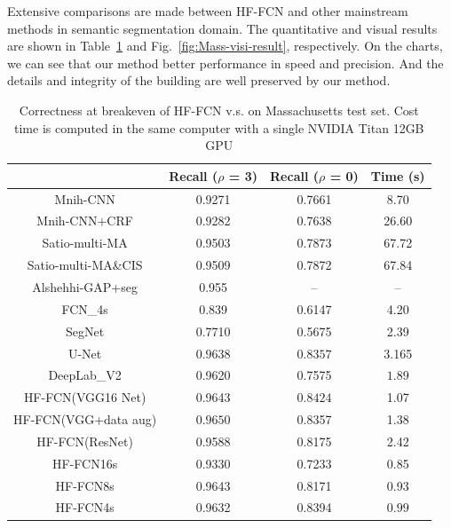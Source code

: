 Extensive comparisons are made between HF-FCN and other mainstream methods in semantic segmentation domain. The quantitative and visual results are shown in Table~\ref{table:Mass-results} and Fig.~\ref{fig:Mass-visi-result}, respectively. On the charts, we can see that our method better performance in speed and precision. And the details and integrity of the building are well preserved by our method.
\begin{table}
\centering
\caption {Correctness at breakeven of HF-FCN v.s. \cite{IEEEexample:mnih2013machine}\cite{IEEEexample:saito2016multiple}\cite{IEEEexample:alshehhi2017simultaneous}\cite{IEEEexample:Long_2015_CVPR}\cite{IEEEexample:badrinarayanan2017segnet}
\cite{IEEEexample:ronneberger2015u}\cite{IEEEexample:chen2016deeplab}on Massachusetts test set. Cost time is computed in the same computer with a single NVIDIA Titan 12GB GPU}
\label{table:Mass-results}
\begin{tabular}{cccc}
\hline
&Recall ($\rho$ = 3)&Recall ($\rho$ = 0)&Time (s)\\
\hline
Mnih-CNN \cite{IEEEexample:mnih2013machine}&0.9271&0.7661&8.70\\
Mnih-CNN+CRF\cite{IEEEexample:mnih2013machine} &0.9282&0.7638&26.60\\
Satio-multi-MA \cite{IEEEexample:saito2016multiple}&0.9503&0.7873&67.72\\
Satio-multi-MA\&CIS \cite{IEEEexample:saito2016multiple}&0.9509&0.7872&67.84\\
Alshehhi-GAP+seg \cite{IEEEexample:alshehhi2017simultaneous}&0.955&{--}&{--} \\ \hline
FCN\_4s\cite{IEEEexample:Long_2015_CVPR}&0.839&0.6147&4.20\\
SegNet\cite{IEEEexample:badrinarayanan2017segnet}&0.7710&0.5675&2.39\\
U-Net\cite{IEEEexample:ronneberger2015u}& $\bm{0.9638}$& $\bm{0.8357}$& 3.165\\
DeepLab\_V2\cite{IEEEexample:chen2016deeplab}&0.9620&0.7575&$\bm{1.89}$\\ \hline
HF-FCN(VGG16 Net)&0.9643& $\bm{0.8424}$ &1.07\\
HF-FCN(VGG+data aug)&$\bm{0.9650}$&0.8357&1.38\\
HF-FCN(ResNet)&0.9588&0.8175&2.42\\
HF-FCN16s &0.9330&0.7233&0.85\\
HF-FCN8s &0.9643&0.8171&0.93\\
HF-FCN4s &0.9632&0.8394&$\bm{0.99}$\\
\hline
\end{tabular}
\end{table}


